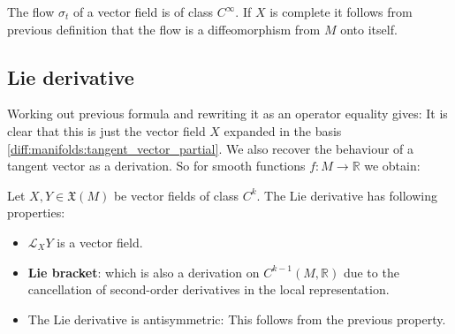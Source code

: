 	\begin{property}
		The flow $\sigma_t$ of a vector field is of class $C^\infty$. If $X$ is complete it follows from previous definition that the flow is a diffeomorphism from $M$ onto itself.
	\end{property}

	
\subsection{Lie derivative}

	
	\begin{formula}[$\dag$]\label{manifolds:ex:lie_derivative_function}
		Working out previous formula and rewriting it as an operator equality gives:
		It is clear that this is just the vector field $X$ expanded in the basis \ref{diff:manifolds:tangent_vector_partial}. We also recover the behaviour of a tangent vector as a derivation. So for smooth functions $f:M\rightarrow\mathbb{R}$ we obtain:
	\end{formula}
	
	\begin{property}
		Let $X, Y\in\mathfrak{X}(M)$ be vector fields of class $C^k$. The Lie derivative has following properties:
		\begin{itemize}
			\item $\mathcal{L}_XY$ is a vector field.
			\item \textbf{Lie bracket}:
				which is also a derivation on $C^{k-1}(M, \mathbb{R})$ due to the cancellation of second-order derivatives in the local representation.
			\item The Lie derivative is antisymmetric: This follows from the previous property.
		\end{itemize}
	\end{property}
	
